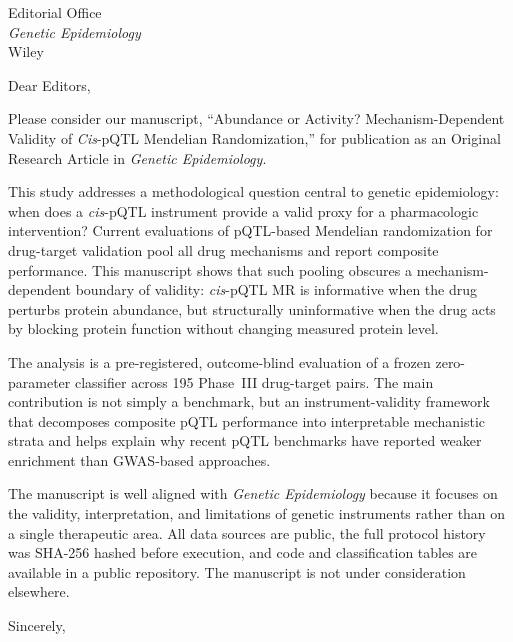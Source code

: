 \documentclass[11pt]{letter}
\begin{document}
\begin{letter}{Editorial Office \\ \emph{Genetic Epidemiology} \\ Wiley}

\opening{Dear Editors,}

Please consider our manuscript, ``Abundance or Activity? Mechanism-Dependent Validity of \emph{Cis}-pQTL Mendelian Randomization,'' for publication as an Original Research Article in \emph{Genetic Epidemiology}.

This study addresses a methodological question central to genetic epidemiology: when does a \emph{cis}-pQTL instrument provide a valid proxy for a pharmacologic intervention? Current evaluations of pQTL-based Mendelian randomization for drug-target validation pool all drug mechanisms and report composite performance. This manuscript shows that such pooling obscures a mechanism-dependent boundary of validity: \emph{cis}-pQTL MR is informative when the drug perturbs protein abundance, but structurally uninformative when the drug acts by blocking protein function without changing measured protein level.

The analysis is a pre-registered, outcome-blind evaluation of a frozen zero-parameter classifier across 195 Phase~III drug-target pairs. The main contribution is not simply a benchmark, but an instrument-validity framework that decomposes composite pQTL performance into interpretable mechanistic strata and helps explain why recent pQTL benchmarks have reported weaker enrichment than GWAS-based approaches.

The manuscript is well aligned with \emph{Genetic Epidemiology} because it focuses on the validity, interpretation, and limitations of genetic instruments rather than on a single therapeutic area. All data sources are public, the full protocol history was SHA-256 hashed before execution, and code and classification tables are available in a public repository. The manuscript is not under consideration elsewhere.

\closing{Sincerely,}

\end{letter}
\end{document}
